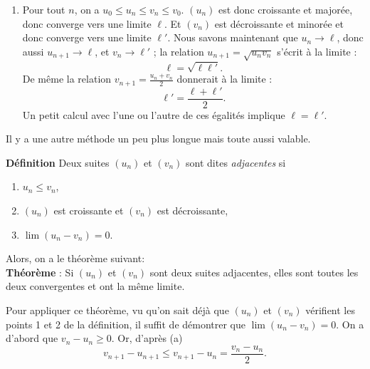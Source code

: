 \documentclass[11pt,a4paper]{article}
\renewcommand{\le}{\leqslant} \renewcommand{\leq}{\leqslant}
\begin{document}
\begin{enumerate}
\begin{enumerate}
        \item  Pour tout $n$, on a $u_0\leqslant u_n\leqslant v_n\leqslant v_0$.
        $(u_n)$ est donc croissante et major\'ee, donc converge
        vers une limite $\ell$. Et $(v_n)$ est d\'ecroissante et
        minor\'ee et donc converge vers une limite $\ell'$. 
Nous savons maintenant que 
$u_{n} \rightarrow \ell$, donc aussi $u_{n+1} \rightarrow \ell$, et $v_{n} \rightarrow \ell'$ ;
la relation $u_{n+1}=\sqrt{u_n v_n}$ s'écrit à la limite :
$$\ell=\sqrt{\ell\ell'}.$$
De même la relation $v_{n+1}=\frac{u_n+v_n}{2}$ donnerait à la limite :
$$\ell'=\frac{\ell+\ell'}{2}.$$
Un petit calcul avec l'une ou l'autre de ces égalités implique $\ell=\ell'$.
    \end{enumerate}
\end{enumerate}

Il y a une autre m\'ethode un peu plus longue mais toute aussi
valable.

{\bf D\'efinition} Deux suites $(u_n)$ et $(v_n)$ sont dites {\em
adjacentes} si
\begin{enumerate}
\item $u_n\leqslant v_n$,
\item $(u_n)$ est croissante et $(v_n)$ est d\'ecroissante,
\item $\lim (u_n-v_n)=0$.
\end{enumerate}

Alors, on a le th\'eor\`eme suivant:\\
 \textbf{Th\'eor\`eme} : Si
$(u_n)$ et $(v_n)$ sont deux suites adjacentes, elles sont toutes les
deux convergentes et ont la m\^eme limite.

Pour appliquer ce th\'eor\`eme, vu qu'on sait d\'ej\`a que $(u_n)$
et $(v_n)$ v\'erifient les points 1 et 2 de la d\'efinition, il
suffit de d\'emontrer que $\lim (u_n-v_n)=0$. On a d'abord que
$v_n-u_n\geqslant 0$. Or, d'apr\`es (a) $$v_{n+1}-u_{n+1}{\le}
v_{n+1}-u_n=\frac{v_n-u_n}{2}. $$
\end{document}

